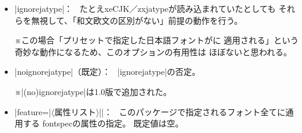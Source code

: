 \documentclass[xelatex,ja=standard,jafont=ipaex,
  a4paper]{bxjsarticle}
\newcommand{\Pkg}[1]{\textsf{#1}}
\newcommand{\Meta}[1]{$\langle$\mbox{}#1\mbox{}$\rangle$}
\newcommand{\Note}{\par\noindent ※}
\newcommand{\Means}{：\ }
\newcommand{\JEmph}{\textgt}
\newcommand{\JSl}{\mbox{／}\linebreak[0]}
\begin{document}
\begin{itemize}
\item |ignorejatype|\Means
たとえ\Pkg{xeCJK}\JSl\Pkg{zxjatype}が読み込まれていたとしても
それらを無視して、「和文欧文の区別がない」前提の動作を行う。
\Note この場合「プリセットで指定した日本語フォントが\JEmph{欧文のみ}に
適用される」という奇妙な動作になるため、このオプションの有用性は
ほぼないと思われる。
\item |noignorejatype|（既定）\Means
|ignorejatype|\>の否定。
\Note |(no)ignorejatype|\>は1.0版で追加された。

\item |feature={|\Meta{属性リスト}|}|\Means
このパッケージで指定されるフォント全てに通用する
\Pkg{fontspec}の属性の指定。
既定値は空。

\end{itemize}

\end{document}

